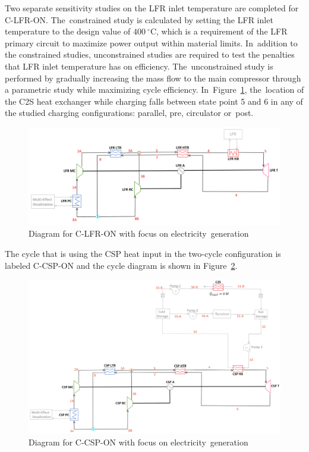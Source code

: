 \documentclass[sustainability,article,accept,moreauthors,pdftex]{Definitions/mdpi}
\begin{document}
\begin{paracol}{2}
Two separate sensitivity studies on the LFR inlet temperature are completed for C-LFR-ON. The~constrained study is calculated by setting the LFR inlet temperature to the design value of $400~^{\circ}$C, which is a requirement of the LFR primary circuit to maximize power output within material limits. In~addition to the constrained studies, unconstrained studies are required to test the penalties that LFR inlet temperature has on efficiency. The~unconstrained study is performed by gradually increasing the mass flow to the main compressor through a parametric study while maximizing cycle efficiency. In~Figure~\ref{c-lfr-on}, the~location of the C2S heat exchanger while charging falls between state point 5 and 6 in any of the studied charging configurations: parallel, pre, circulator or~post. 

\begin{figure}[H] 
    \includegraphics[width=\linewidth]{Definitions/c-lfr-on.pdf}
    \caption{Diagram for C-LFR-ON with focus on electricity~generation\label{c-lfr-on}}
\end{figure}

The cycle that is using the CSP heat input in the two-cycle configuration is labeled C-CSP-ON and the cycle diagram is shown in Figure~\ref{c-csp-on}. 

\end{paracol}
\begin{figure}[H] 
    \widefigure
    \includegraphics[width=\linewidth]{Definitions/c-csp-on.pdf}
    \caption{Diagram for C-CSP-ON with focus on electricity~generation\label{c-csp-on}}
\end{figure}
\end{document}
